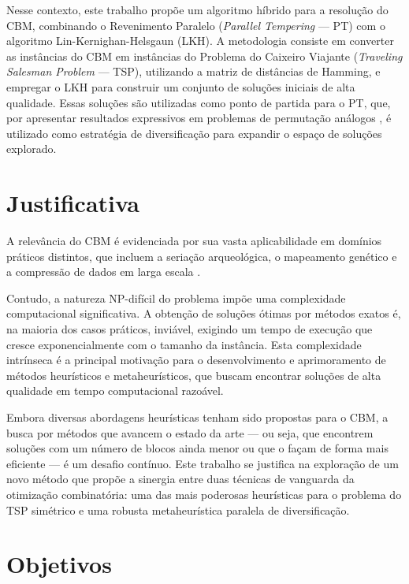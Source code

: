Nesse contexto, este trabalho propõe um algoritmo híbrido para a resolução do CBM, combinando o Revenimento Paralelo (\textit{Parallel Tempering} — PT) com o algoritmo Lin-Kernighan-Helsgaun (LKH). A metodologia consiste em converter as instâncias do CBM em instâncias do Problema do Caixeiro Viajante (\textit{Traveling Salesman Problem} — TSP), utilizando a matriz de distâncias de Hamming, e empregar o LKH para construir um conjunto de soluções iniciais de alta qualidade. Essas soluções são utilizadas como ponto de partida para o PT, que, por apresentar resultados expressivos em problemas de permutação análogos \cite{ALMEIDA2025107000}, é utilizado como estratégia de diversificação para expandir o espaço de soluções explorado.

\section{Justificativa}

A relevância do CBM é evidenciada por sua vasta aplicabilidade em domínios práticos distintos, que incluem a seriação arqueológica, o mapeamento genético e a compressão de dados em larga escala \cite{kendall1969incidence, alizadeh1995physical, lemire2011reordering}.

Contudo, a natureza NP-difícil do problema \cite{kou1977polynomial} impõe uma complexidade computacional significativa. A obtenção de soluções ótimas por métodos exatos é, na maioria dos casos práticos, inviável, exigindo um tempo de execução que cresce exponencialmente com o tamanho da instância. Esta complexidade intrínseca é a principal motivação para o desenvolvimento e aprimoramento de métodos heurísticos e metaheurísticos, que buscam encontrar soluções de alta qualidade em tempo computacional razoável.

Embora diversas abordagens heurísticas tenham sido propostas para o CBM, a busca por métodos que avancem o estado da arte — ou seja, que encontrem soluções com um número de blocos ainda menor ou que o façam de forma mais eficiente — é um desafio contínuo. Este trabalho se justifica na exploração de um novo método que propõe a sinergia entre duas técnicas de vanguarda da otimização combinatória: uma das mais poderosas heurísticas para o problema do TSP simétrico e uma robusta metaheurística paralela de diversificação.

\section{Objetivos}


